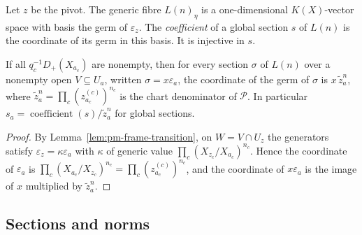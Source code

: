 \begin{definition}
\label{def:pm-pivot-coefficient}
\leanok
{}
Let $z$ be the pivot. The generic fibre $L(n)_\eta$ is a one-dimensional $K(X)$-vector space
with basis the germ of $\varepsilon_z$. The \emph{coefficient} of a global section $s$ of
$L(n)$ is the coordinate of its germ in this basis. It is injective in $s$.
\end{definition}

\begin{lemma}
\label{lem:pm-pivot-coefficient}
\leanok
{}
If all $q_c^{-1}D_+(X_{a_c})$ are nonempty, then for every section $\sigma$ of $L(n)$ over a
nonempty open $V\subseteq U_a$, written $\sigma=x\varepsilon_a$, the coordinate of the germ of
$\sigma$ is $x\,\tilde z_a^n$, where $\tilde z_a^n=\prod_c(z^{(c)}_{a_c})^{n_c}$ is the chart
denominator of $\mathcal P$. In particular $s_a=\operatorname{coefficient}(s)/\tilde z_a^n$ for
global sections.
\end{lemma}
\begin{proof}
\leanok
By Lemma~\ref{lem:pm-frame-transition}, on $W=V\cap U_z$ the generators satisfy
$\varepsilon_z=\kappa\varepsilon_a$ with $\kappa$ of generic value
$\prod_c(X_{z_c}/X_{a_c})^{n_c}$. Hence the coordinate of $\varepsilon_a$ is
$\prod_c(X_{a_c}/X_{z_c})^{n_c}=\prod_c(z^{(c)}_{a_c})^{n_c}$, and the coordinate of
$x\varepsilon_a$ is the image of $x$ multiplied by $\tilde z_a^n$.
\end{proof}

\subsection{Sections and norms}

